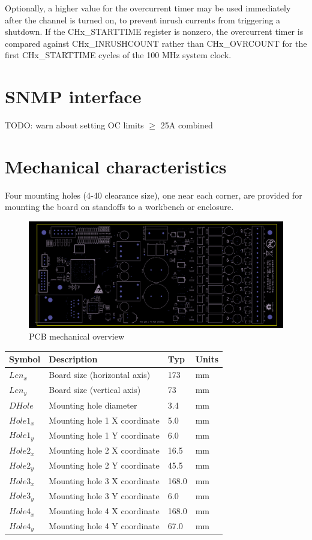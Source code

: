 \documentclass{article}
\begin{document}
Optionally, a higher value for the overcurrent timer may be used immediately after the channel is turned on, to 
prevent inrush currents from triggering a shutdown. If the CHx\_STARTTIME register is nonzero, the overcurrent timer 
is compared against CHx\_INRUSHCOUNT rather than CHx\_OVRCOUNT for the first CHx\_STARTTIME cycles of the 100 MHz system
clock.

\pagebreak
\section{SNMP interface}

TODO: warn about setting OC limits $\geq$ 25A combined

\pagebreak
\section{Mechanical characteristics}

Four mounting holes (4-40 clearance size), one near each corner, are provided for mounting the board on standoffs to a 
workbench or enclosure.

\begin{figure}[h]
\includegraphics[scale=0.19]{silk-front-small.png}
\caption{PCB mechanical overview}
\label{silk-front}
\end{figure}

\begin{longtable}{|l|p{2in}|p{0.5in}|p{0.5in}|}
\hline
{\bf Symbol} & {\bf Description} & {\bf Typ} & {\bf Units}\\
\hline
$Len_{x}$ & Board size (horizontal axis) & 173 & mm\\
\hline
$Len_{y}$ & Board size (vertical axis) & 73 & mm\\
\hline
$DHole$ & Mounting hole diameter & 3.4 & mm\\
\hline
$Hole1_{x}$ & Mounting hole 1 X coordinate & 5.0 & mm\\
$Hole1_{y}$ & Mounting hole 1 Y coordinate & 6.0 & mm\\
\hline
$Hole2_{x}$ & Mounting hole 2 X coordinate & 16.5 & mm\\
$Hole2_{y}$ & Mounting hole 2 Y coordinate & 45.5 & mm\\
\hline
$Hole3_{x}$ & Mounting hole 3 X coordinate & 168.0 & mm\\
$Hole3_{y}$ & Mounting hole 3 Y coordinate & 6.0 & mm\\
\hline
$Hole4_{x}$ & Mounting hole 4 X coordinate & 168.0 & mm\\
$Hole4_{y}$ & Mounting hole 4 Y coordinate & 67.0 & mm\\
\hline
\end{longtable}
\end{document}
